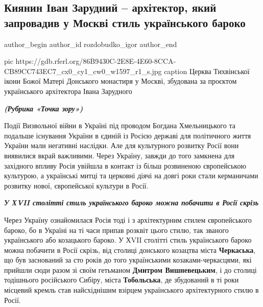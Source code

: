  
 
 
 
 
 
\subsection{Киянин Іван Зарудний – архітектор, який запровадив у Москві стиль українського бароко}
\label{sec:21_12_2020.news.radiosvoboda.rozdobudko_igor.1.ivan_zarudnyy_moskva}
\ifcmt
	author_begin
   author_id rozdobudko_igor
	author_end
\fi


\ifcmt
pic https://gdb.rferl.org/86B9430C-2E8E-4E60-8CCA-CB89CC743EC7_cx0_cy1_cw0_w1597_r1_s.jpg
caption Церква Тихвінської ікони Божої Матері Донського монастиря у Москві, збудована за проєктом українського архітектора Івана Зарудного 
\fi


\begingroup
	\large\em\bfseries
(Рубрика «Точка зору»)

Події Визвольної війни в Україні під проводом Богдана Хмельницького та подальше
існування України в єдиній із Росією державі для політичного життя України мали
негативні наслідки. Але для культурного розвитку Росії вони виявилися вкрай
важливими. Через Україну, завжди до того замкнена для західного впливу Росія
увійшла в контакт із більш розвиненою європейською культурою, а українські
митці та церковні діячі на довгі роки стали керманичами розвитку нової,
європейської культури в Росії.
\endgroup

\begin{leftbar}
	\begingroup
		\em\large\color{orange}\bfseries 
		У ХVII столітті стиль українського бароко можна побачити в Росії скрізь
	\endgroup
\end{leftbar}

Через Україну ознайомилася Росія тоді і з архітектурним стилем європейського
бароко, бо в Україні на ті часи припав розквіт цього стилю, так званого
українського або козацького бароко. У ХVII столітті стиль українського бароко
можна побачити в Росії скрізь, від столиці донського козацтва міста \textbf{Черкаська},
що був заснований за сто років до того українськими козаками-черкасцями, які
прийшли сюди разом зі своїм гетьманом \textbf{Дмитром Вишневецьким}, і до столиці
тодішнього російського Сибіру, міста \textbf{Тобольська}, де збудований в ті роки
місцевий кремль став найсхіднішим взірцем українського архітектурного стилю в
Росії.

